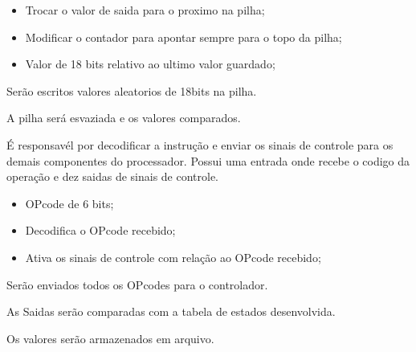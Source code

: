 \documentclass{article}
\begin{document}
  \actions
  \begin{itemize}
     \item Trocar o valor de saida para o proximo na pilha;
     \item Modificar o contador para apontar sempre para o topo da pilha;
    \end{itemize}
  
  \results
  	\begin{itemize}
     \item Valor de 18 bits relativo ao ultimo valor guardado; 
    \end{itemize}
  
  \begin{mainflow}
     \item Serão escritos valores aleatorios de  18bits na pilha.
     \item A pilha será esvaziada e os valores comparados.
  \end{mainflow}

É responsavél por decodificar a instrução e enviar os sinais de controle para os demais componentes do processador. Possui uma entrada onde recebe o codigo da operação e dez saidas de sinais de controle.
  
  	\begin{itemize}
     \item OPcode de 6 bits;
     \end{itemize}
    
  \actions
  \begin{itemize}
     \item Decodifica o OPcode recebido;
    \end{itemize}
  
  \results
  	\begin{itemize}
     \item  Ativa os sinais de controle com relação ao OPcode recebido; 
    \end{itemize}
  
  \begin{mainflow}
     \item Serão enviados todos os OPcodes para o controlador.
     \item As Saidas serão comparadas com a tabela de estados desenvolvida.
     \item Os valores serão armazenados em arquivo.
  \end{mainflow}

% 
% 
\end{document}
